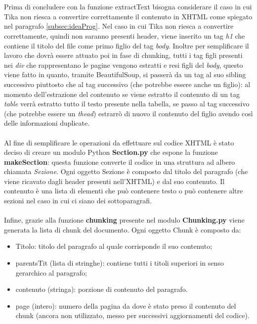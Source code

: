 \\\\Prima di concludere con la funzione extractText bisogna considerare il caso in cui Tika non riesca a convertire correttamente il contenuto in XHTML come spiegato nel paragrafo \ref{subsec:ideaProg}.
Nel caso in cui Tika non riesca a convertire correttamente, quindi non saranno presenti header, viene inserito un tag \emph{h1} che contiene il titolo del file come primo figlio del tag \emph{body}.
Inoltre per semplificare il lavoro che dovrà essere attuato poi in fase di chunking, tutti i tag figli presenti nei \emph{div} che rappresentano le pagine vengono estratti e resi figli del \emph{body}, questo viene fatto in quanto, tramite BeautifulSoup, si passerà da un tag al suo sibling successivo piuttosto che al tag successivo (che potrebbe essere anche un figlio): al momento dell'estrazione del contenuto se viene estratto il contenuto di un tag \emph{table} verrà estratto tutto il testo presente nella tabella, se passo al tag successivo (che potrebbe essere un \emph{thead}) estrarrò di nuovo il contenuto del figlio avendo così delle informazioni duplicate.
\\\\Al fine di semplificare le operazioni da effettuare sul codice XHTML è stato deciso di creare un modulo Python \textbf{Section.py} che espone la funzione \textbf{makeSection}: questa funzione converte il codice in una struttura ad albero chiamata \emph{Sezione}.
Ogni oggetto Sezione è composto dal titolo del paragrafo (che viene ricavato dagli header presenti nell'XHTML) e dal suo contenuto. Il contenuto è una lista di elementi che può contenere testo o può contenere altre sezioni nel caso in cui ci siano dei sottoparagrafi.
\\\\Infine, grazie alla funzione \textbf{chunking} presente nel modulo \textbf{Chunking.py} viene generata la lista di chunk del documento.
Ogni oggetto Chunk è composto da:
\begin{itemize}
    \item Titolo: titolo del paragrafo al quale corrisponde il suo contenuto;
    \item parentsTit (lista di stringhe): contiene tutti i titoli superiori in senso gerarchico al paragrafo;
    \item contenuto (stringa): porzione di contenuto del paragrafo.
    \item page (intero): numero della pagina da dove è stato preso il contenuto del chunk (ancora non utilizzato, messo per successivi aggiornamenti del codice). 
\end{itemize}

